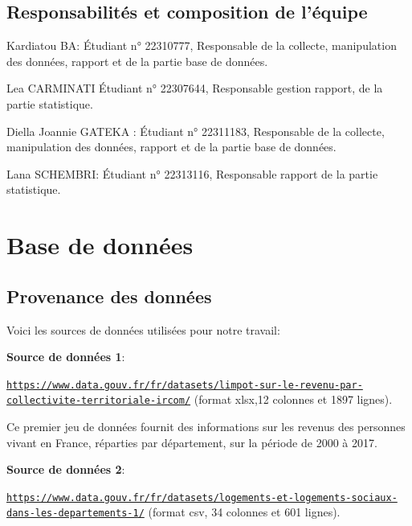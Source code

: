 \documentclass[mstat,12pt]{unswthesis}
\begin{document}
\section{Responsabilités et composition de
l'équipe}\label{responsabilituxe9s-et-composition-de-luxe9quipe}

\medskip

Kardiatou BA: Étudiant n° 22310777, Responsable de la collecte,
manipulation des données, rapport et de la partie base de données.

\medskip

Lea CARMINATI Étudiant n° 22307644, Responsable gestion rapport, de la
partie statistique.

\medskip

Diella Joannie GATEKA : Étudiant n° 22311183, Responsable de la
collecte, manipulation des données, rapport et de la partie base de
données.

\medskip

Lana SCHEMBRI: Étudiant n° 22313116, Responsable rapport de la partie
statistique.

\chapter{Base de données}\label{base-de-donnuxe9es}

\section{Provenance des données}\label{provenance-des-donnuxe9es}

Voici les sources de données utilisées pour notre travail:

\textbf{Source de données 1}:

\tiny

\texttt{\url{https://www.data.gouv.fr/fr/datasets/limpot-sur-le-revenu-par-collectivite-territoriale-ircom/}}
\normalsize (format xlsx,12 colonnes et 1897 lignes).

Ce premier jeu de données fournit des informations sur les revenus des
personnes vivant en France, réparties par département, sur la période de
2000 à 2017.

\bigskip

\textbf{Source de données 2}:

\tiny

\texttt{\url{https://www.data.gouv.fr/fr/datasets/logements-et-logements-sociaux-dans-les-departements-1/}}
\normalsize (format csv, 34 colonnes et 601 lignes).
\end{document}
